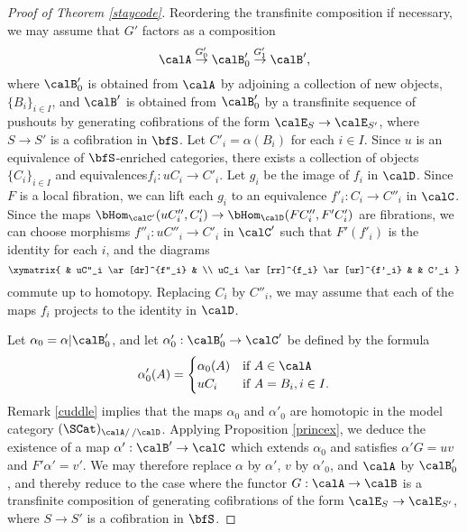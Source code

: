 \begin{Simplicial Categories}
\begin{proof}[Proof of Theorem \ref{staycode}]
Reordering the transfinite composition if necessary, we may assume that $G'$ factors as a
composition
$$ \calA \stackrel{G'_0}{\rightarrow} \calB'_0 \stackrel{G'_1}{\rightarrow} \calB',$$
where $\calB'_0$ is obtained from $\calA$ by adjoining a collection of new objects,
$\{B_i \}_{i \in I}$, and $\calB'$ is obtained from $\calB'_0$ by a transfinite sequence of pushouts
by generating cofibrations of the form $\calE_{S} \rightarrow \calE_{S'}$, where
$S \rightarrow S'$ is a cofibration in $\bfS$. Let $C'_i = \alpha(B_i)$ for each $i \in I$.
Since $u$ is an equivalence of $\bfS$-enriched categories, there exists a collection
of objects $\{ C_i \}_{i \in I}$ and equivalences$f_i: u C_i \rightarrow C'_i$. 
Let $g_i$ be the image of $f_i$ in $\calD$. Since $F$ is a local fibration, 
we can lift each $g_i$ to an equivalence
$f'_i: C_i \rightarrow C''_i$ in $\calC$. 
Since the maps $\bHom_{\calC'}( uC''_i, C'_i) \rightarrow \bHom_{\calD}( FC''_i, F'C'_i)$
are fibrations, we can choose morphisms $f''_i: uC''_i \rightarrow C'_i$
in $\calC'$ such that $F'( f'_i)$ is the identity for each $i$, and the diagrams
$$ \xymatrix{ & uC''_i \ar[dr]^{f''_i} & \\
uC_i \ar[rr]^{f_i} \ar[ur]^{f'_i} & & C'_i }$$
commute up to homotopy. Replacing $C_i$ by $C''_i$, we may assume
that each of the maps $f_i$ projects to the identity in $\calD$.

Let $\alpha_0 = \alpha | \calB'_0$, and let $\alpha'_0: \calB'_0 \rightarrow \calC'$ be defined by the formula $$ \alpha'_0(A) = \begin{cases} \alpha_0(A) & \text{if } A \in \calA \\
uC_i & \text{if } A = B_i, i \in I. \end{cases}$$
Remark \ref{cuddle} implies that the maps $\alpha_0$ and
$\alpha'_0$ are homotopic in the model category
$(\SCat)_{\calA/ \, / \calD}$. Applying Proposition \ref{princex}, we deduce the existence of a map
$\alpha': \calB' \rightarrow \calC$ which extends $\alpha_0$ and satisfies
$\alpha' G = u v$ and $F' \alpha' = v'$. We may therefore replace 
$\alpha$ by $\alpha'$, $v$ by $\alpha'_0$, and $\calA$ by $\calB'_0$, and thereby
reduce to the case where the functor $G: \calA \rightarrow \calB$ is a transfinite
composition of generating cofibrations of the form $\calE_{S} \rightarrow \calE_{S'}$, where
$S \rightarrow S'$ is a cofibration in $\bfS$.


\end{proof}
\end{Simplicial Categories}
